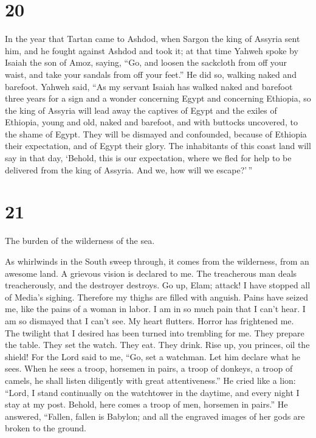 \hypertarget{section-19}{%
\section{20}\label{section-19}}

 In the year that Tartan came to Ashdod, when Sargon the
king of Assyria sent him, and he fought against Ashdod and took it;
 at that time Yahweh spoke by Isaiah the son of Amoz,
saying, ``Go, and loosen the sackcloth from off your waist, and take
your sandals from off your feet.'' He did so, walking naked and
barefoot.  Yahweh said, ``As my servant Isaiah has walked
naked and barefoot three years for a sign and a wonder concerning Egypt
and concerning Ethiopia,  so the king of Assyria will lead
away the captives of Egypt and the exiles of Ethiopia, young and old,
naked and barefoot, and with buttocks uncovered, to the shame of Egypt.
 They will be dismayed and confounded, because of Ethiopia
their expectation, and of Egypt their glory.  The
inhabitants of this coast land will say in that day, `Behold, this is
our expectation, where we fled for help to be delivered from the king of
Assyria. And we, how will we escape?'\,''

\hypertarget{section-20}{%
\section{21}\label{section-20}}

 The burden of the wilderness of the sea.

As whirlwinds in the South sweep through, it comes from the wilderness,
from an awesome land.  A grievous vision is declared to
me. The treacherous man deals treacherously, and the destroyer destroys.
Go up, Elam; attack! I have stopped all of Media's sighing.
 Therefore my thighs are filled with anguish. Pains have
seized me, like the pains of a woman in labor. I am in so much pain that
I can't hear. I am so dismayed that I can't see.  My heart
flutters. Horror has frightened me. The twilight that I desired has been
turned into trembling for me.  They prepare the table.
They set the watch. They eat. They drink. Rise up, you princes, oil the
shield!  For the Lord said to me, ``Go, set a watchman.
Let him declare what he sees.  When he sees a troop,
horsemen in pairs, a troop of donkeys, a troop of camels, he shall
listen diligently with great attentiveness.''  He cried
like a lion: ``Lord, I stand continually on the watchtower in the
daytime, and every night I stay at my post.  Behold, here
comes a troop of men, horsemen in pairs.'' He answered, ``Fallen, fallen
is Babylon; and all the engraved images of her gods are broken to the
ground.

